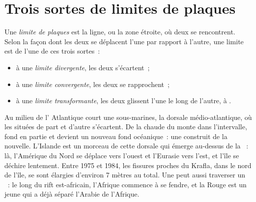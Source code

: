\section{Trois sortes de limites de plaques}

\begin{definition}\label{def:g7:plate-tectonics:plate-boundary}
Une \emph{limite de plaques} est la ligne, ou la
zone étroite, où deux  se rencontrent. Selon la façon dont les deux
 se déplacent l'une par rapport à l'autre, une limite est de l'une
de ces trois sortes~:
\begin{itemize}
  \item à une \emph{limite divergente}, les deux
         s'écartent~;
  \item à une \emph{limite convergente}, les deux
         se rapprochent~;
  \item à une \emph{limite transformante}, les
        deux  glissent l'une le long de l'autre,  à .
\end{itemize}
\end{definition}

\begin{example}\label{ex:g7:plate-tectonics:divergent}
Au milieu de l' Atlantique court une  sous-marines,
la dorsale médio-atlantique, où les  situées de part et d'autre
s'écartent. De la  chaude du  monte dans l'intervalle, fond en
partie et devient un nouveau fond océanique~: une 
construit de la  nouvelle. L'Islande est un morceau de cette dorsale
qui émerge au-dessus de la ~: là, l'Amérique du Nord se déplace vers
l'ouest et l'Eurasie vers l'est, et l'île se déchire lentement. Entre 1975
et 1984, les fissures proches du  Krafla, dans le nord de l'île, se
sont élargies d'environ 7 mètres au total. Une  peut aussi
traverser un ~: le long du rift est-africain, l'Afrique commence à
se fendre, et la  Rouge est un jeune  qui a déjà séparé l'Arabie de
l'Afrique.
\end{example}

